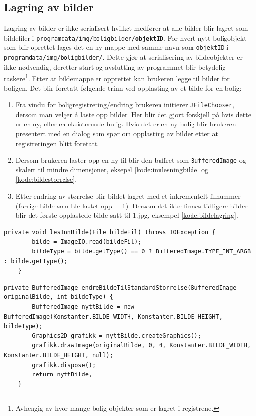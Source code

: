 \subsection{Lagring av bilder}
Lagring av bilder er ikke serialisert hvilket medfører at alle bilder blir lagret som bildefiler i \texttt{programdata/img/boligbilder/\textbf{objektID}}. For hvert nytt boligobjekt som blir oprettet lages det en ny mappe med samme navn som \texttt{objektID} i \texttt{programdata/img/boligbilder/}. Dette gjør at serialisering av bildeobjekter er ikke nødvendig, deretter start og avslutting av programmet blir betydelig raskere\footnote{Avhengig av hvor mange bolig objekter som er lagret i registrene.}. Etter at bildemappe er opprettet kan brukeren legge til bilder for boligen. Det blir foretatt følgende trinn ved opplasting av et bilde for en bolig:
\begin{enumerate}

\item Fra vindu for boligregistrering/endring brukeren initierer \texttt{JFileChooser}, dersom man velger å laste opp bilder. Her blir det gjort forskjell på hvis dette er en ny, eller en eksisterende bolig. Hvis det er en ny bolig blir brukeren presentert med en dialog som spør om opplasting av bilder etter at registreringen blitt foretatt.

\item Dersom brukeren laster opp en ny fil blir den buffret som \texttt{BufferedImage} og skalert til mindre dimensjoner, eksepel \ref{kode:innlesningbilde} og \ref{kode:bildestorrelse}.

\item Etter endring av størrelse blir bildet lagret med et inkrementelt filnummer (forrige bilde som ble lastet opp + 1). Dersom det ikke finnes tidligere bilder blir det første opplastede bilde satt til 1.jpg, eksempel \ref{kode:bildelagring}.

\end{enumerate}

\begin{lstlisting}[caption=BoligBilde.java: Innlesning av bildefil, label=kode:innlesningbilde]
	private void lesInnBilde(File bildeFil) throws IOException {
        bilde = ImageIO.read(bildeFil);
        bildeType = bilde.getType() == 0 ? BufferedImage.TYPE_INT_ARGB : bilde.getType();
    }
\end{lstlisting}

\begin{lstlisting}[caption=BoligBilde.java: Endring av opplastet bildestørrelse, label=kode:bildestorrelse]
	private BufferedImage endreBildeTilStandardStorrelse(BufferedImage originalBilde, int bildeType) {
        BufferedImage nyttBilde = new BufferedImage(Konstanter.BILDE_WIDTH, Konstanter.BILDE_HEIGHT, bildeType);
        Graphics2D grafikk = nyttBilde.createGraphics();
        grafikk.drawImage(originalBilde, 0, 0, Konstanter.BILDE_WIDTH, Konstanter.BILDE_HEIGHT, null);
        grafikk.dispose();
        return nyttBilde;
    }
\end{lstlisting}

